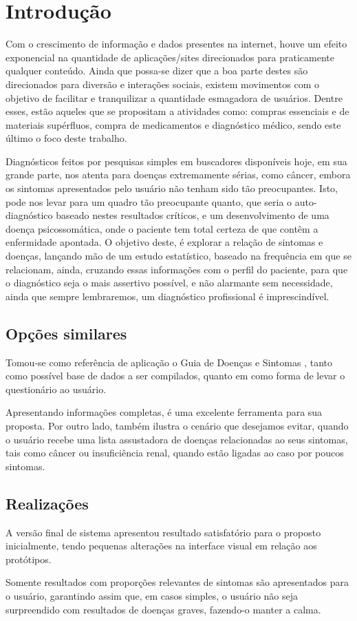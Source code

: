 \section{Introdução}

Com o crescimento de informação e dados presentes na internet, houve um efeito exponencial na quantidade de aplicações/sites direcionados para praticamente qualquer conteúdo.
Ainda que possa-se dizer que a boa parte destes são direcionados para diversão e interações sociais, existem movimentos com o objetivo de facilitar e tranquilizar a quantidade esmagadora de usuários. Dentre esses, estão aqueles que se propositam a atividades como: compras essenciais e de materiais supérfluos, compra de medicamentos e  diagnóstico médico, sendo este último o foco deste trabalho.

Diagnósticos feitos por pesquisas simples em buscadores disponíveis hoje, em sua grande parte, nos atenta para doenças extremamente sérias, como câncer, embora os sintomas apresentados pelo usuário não tenham sido tão preocupantes.
Isto, pode nos levar para um quadro tão preocupante quanto, que seria o auto-diagnóstico baseado nestes resultados críticos, e um desenvolvimento de uma doença psicossomática, onde o paciente tem total certeza de que contêm a enfermidade apontada.
O objetivo deste, é explorar a relação de sintomas e doenças, lançando mão de um estudo estatístico, baseado na frequência em que se relacionam, ainda, cruzando essas informações com o perfil do paciente, para que o diagnóstico seja o mais assertivo possível, e não alarmante sem necessidade, ainda que sempre lembraremos, um diagnóstico profissional é imprescindível.

\subsection{Opções similares}

Tomou-se como referência de aplicação o Guia de Doenças e Sintomas \cite{AlbertEinstein}, tanto como possível base de dados a ser compilados, quanto em como forma de levar o questionário ao usuário.

Apresentando informações completas, é uma excelente ferramenta para sua proposta.
Por outro lado, também ilustra o cenário que desejamos evitar, quando o usuário recebe uma lista assustadora de doenças relacionadas ao seus sintomas, tais como câncer ou insuficiência renal, quando estão ligadas ao caso por poucos sintomas.

\subsection{Realizações}

A versão final de sistema apresentou resultado satisfatório para o proposto inicialmente, tendo pequenas alterações na interface visual em relação aos protótipos.

Somente resultados com proporções relevantes de sintomas são apresentados para o usuário, garantindo assim que, em casos simples, o usuário não seja surpreendido com resultados de doenças graves, fazendo-o manter a calma.